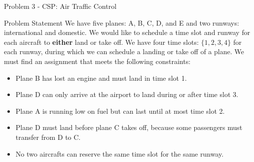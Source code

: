\begin{problem}{Problem 3 - CSP: Air Traffic Control}
    \begin{statement}{Problem Statement}
        We have five planes: A, B, C, D, and E and two runways: international and domestic. We would like to schedule a time slot and runway for each aircraft to \textbf{either} land or take off. We 
        have four time slots: $\{1, 2, 3, 4\}$ for each runway, during which we can schedule a landing or take off of a plane. We must find an assignment that meets the following constraints:

        \begin{itemize}
            \item Plane B has lost an engine and must land in time slot 1.
            \item Plane D can only arrive at the airport to land during or after time slot 3.
            \item Plane A is running low on fuel but can last until at most time slot 2.
            \item Plane D must land before plane C takes off, because some passengers must transfer from D to C.
            \item No two aircrafts can reserve the same time slot for the same runway.
        \end{itemize}


\end{statement}
\end{problem}
